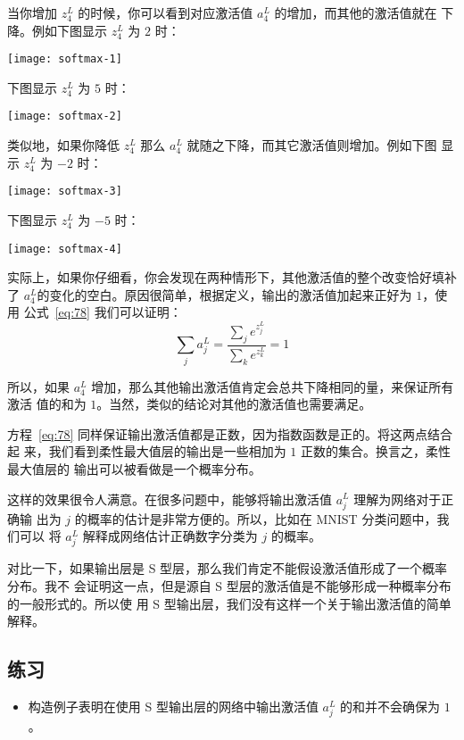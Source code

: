 当你增加 $z^L_4$ 的时候，你可以看到对应激活值 $a^L_4$ 的增加，而其他的激活值就在
下降。例如下图显示 $z^L_4$ 为 $2$ 时：
\begin{center}
  \texttt{[image: softmax-1]}
\end{center}

下图显示 $z^L_4$ 为 $5$ 时：
\begin{center}
  \texttt{[image: softmax-2]}
\end{center}

类似地，如果你降低 $z^L_4$ 那么 $a^L_4$ 就随之下降，而其它激活值则增加。例如下图
显示 $z^L_4$ 为 $-2$ 时：
\begin{center}
  \texttt{[image: softmax-3]}
\end{center}

下图显示 $z^L_4$ 为 $-5$ 时：
\begin{center}
  \texttt{[image: softmax-4]}
\end{center}

实际上，如果你仔细看，你会发现在两种情形下，其他激活值的整个改变恰好填补
了 $a^L_4$的变化的空白。原因很简单，根据定义，输出的激活值加起来正好为 $1$，使用
公式~\eqref{eq:78} 我们可以证明：
\begin{equation}
  \sum_j a^L_j = \frac{\sum_j e^{z^L_j}}{\sum_k e^{z^L_k}} = 1
  \label{eq:79}\tag{79}
\end{equation}

所以，如果 $a^L_4$ 增加，那么其他输出激活值肯定会总共下降相同的量，来保证所有激活
值的和为 $1$。当然，类似的结论对其他的激活值也需要满足。

方程~\eqref{eq:78} 同样保证输出激活值都是正数，因为指数函数是正的。将这两点结合起
来，我们看到柔性最大值层的输出是一些相加为 $1$ 正数的集合。换言之，柔性最大值层的
输出可以被看做是一个概率分布。

这样的效果很令人满意。在很多问题中，能够将输出激活值 $a^L_j$ 理解为网络对于正确输
出为 $j$ 的概率的估计是非常方便的。所以，比如在 MNIST 分类问题中，我们可以
将 $a^L_j$ 解释成网络估计正确数字分类为 $j$ 的概率。

对比一下，如果输出层是 S 型层，那么我们肯定不能假设激活值形成了一个概率分布。我不
会证明这一点，但是源自 S 型层的激活值是不能够形成一种概率分布的一般形式的。所以使
用 S 型输出层，我们没有这样一个关于输出激活值的简单解释。

\subsection*{练习}

\begin{itemize}
\item 构造例子表明在使用 S 型输出层的网络中输出激活值 $a^L_j$ 的和并不会确保为
  $1$。
\end{itemize}

